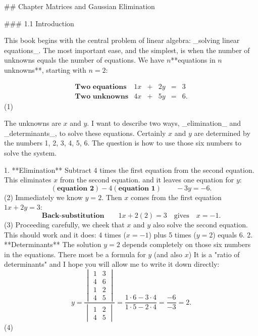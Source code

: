 

## Chapter Matrices and Gaussian Elimination

### 1.1 Introduction

This book begins with the central problem of linear algebra: _solving linear equations_. The most important ease, and the simplest, is when the number of unknowns equals the number of equations. We have \(n\)**equations in \(n\) unknowns**, starting with \(n=2\):

\[\begin{array}{ccccc}\textbf{Two equations}&1x&+&2y&=&3\\ \textbf{Two unknowns}&4x&+&5y&=&6.\end{array}\] (1)

The unknowns are \(x\) and \(y\). I want to describe two ways, _elimination_ and _determinants_, to solve these equations. Certainly \(x\) and \(y\) are determined by the numbers 1, 2, 3, 4, 5, 6. The question is how to use those six numbers to solve the system.

1. **Elimination** Subtract 4 times the first equation from the second equation. This eliminates \(x\) from the second equation. and it leaves one equation for \(y\): \[(\textbf{equation 2})-4(\textbf{equation 1})\qquad-3y=-6.\] (2) Immediately we know \(y=2\). Then \(x\) comes from the first equation \(1x+2y=3\): \[\textbf{Back-substitution}\qquad 1x+2(2)=3\quad\text{gives}\quad x=-1.\] (3) Proceeding carefully, we cheek that \(x\) and \(y\) also solve the second equation. This should work and it does: 4 times (\(x=-1\)) plus 5 times (\(y=2\)) equals 6.
2. **Determinants** The solution \(y=2\) depends completely on those six numbers in the equations. There most be a formula for \(y\) (and also \(x\)) It is a "ratio of determinants" and I hope you will allow me to write it down directly: \[y=\frac{\begin{vmatrix}1&3\\ 4&6\\ \hline 1&2\\ 4&5\end{vmatrix}}{\begin{vmatrix}1&2\\ 4&5\end{vmatrix}}=\frac{1\cdot 6-3\cdot 4}{1\cdot 5-2\cdot 4}=\frac{-6}{-3}=2.\] (4)